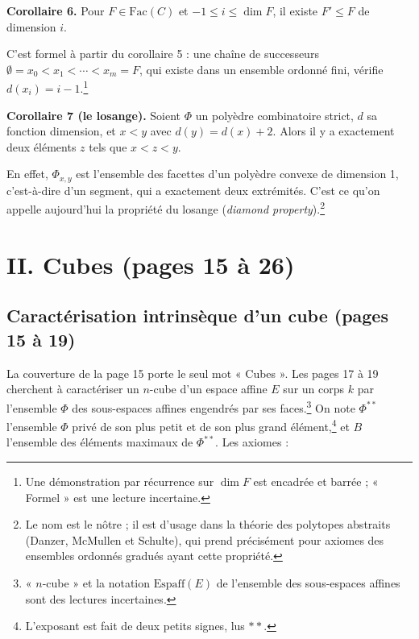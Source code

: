 \documentclass[11pt,a4paper]{article}
\begin{document}
\textbf{Corollaire 6.} Pour $F \in \mathrm{Fac}(C)$ et $-1 \leq i \leq \dim F$,
il existe $F' \leq F$ de dimension $i$.

C'est formel à partir du corollaire 5 : une chaîne de successeurs
$\emptyset = x_{0} < x_{1} < \cdots < x_{m} = F$, qui existe dans un ensemble
ordonné fini, vérifie $d(x_{i}) = i - 1$.\footnote{Une démonstration par
récurrence sur $\dim F$ est encadrée et barrée ; « Formel » est une lecture
incertaine.}

\textbf{Corollaire 7 (le losange).} Soient $\Phi$ un polyèdre combinatoire
strict, $d$ sa fonction dimension, et $x < y$ avec $d(y) = d(x) + 2$. Alors il y
a exactement deux éléments $z$ tels que $x < z < y$.

En effet, $\Phi_{x,y}$ est l'ensemble des facettes d'un polyèdre convexe de
dimension 1, c'est-à-dire d'un segment, qui a exactement deux extrémités. C'est
ce qu'on appelle aujourd'hui la propriété du losange (\emph{diamond
property}).\footnote{Le nom est le nôtre ; il est d'usage dans la théorie des
polytopes abstraits (Danzer, McMullen et Schulte), qui prend précisément pour
axiomes des ensembles ordonnés gradués ayant cette propriété.}

\section*{II. Cubes (pages 15 à 26)}

\subsection*{Caractérisation intrinsèque d'un cube (pages 15 à 19)}

La couverture de la page 15 porte le seul mot « Cubes ». Les pages 17 à 19
cherchent à caractériser un $n$-cube d'un espace affine $E$ sur un corps $k$ par
l'ensemble $\Phi$ des sous-espaces affines engendrés par ses
faces.\footnote{« $n$-cube » et la notation $\mathrm{Espaff}(E)$ de l'ensemble
des sous-espaces affines sont des lectures incertaines.} On note $\Phi^{**}$
l'ensemble $\Phi$ privé de son plus petit et de son plus grand
élément,\footnote{L'exposant est fait de deux petits signes, lus $**$.} et $B$
l'ensemble des éléments maximaux de $\Phi^{**}$. Les axiomes :
\end{document}
